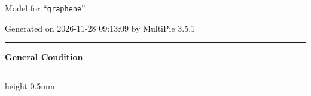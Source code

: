 \documentclass[fleqn,10pt,landscape]{jsarticle}
\begin{document}
\setcounter{MaxMatrixCols}{32}

\renewcommand{\tablename}{Table~}
\renewcommand{\figurename}{Figure~}
\setlength{\baselineskip}{16pt}
\setlength{\parindent}{0pt}
\setlength{\mathindent}{0pt}
\footnotesize
\begin{center}
\LARGE
Model for ``\texttt{graphene}''
\end{center}
\begin{flushright}
Generated on 2026-11-28 09:13:09 by MultiPie 3.5.1
\end{flushright}
\setlength{\baselineskip}{16pt}
\footnotesize
\vspace{5mm}
\noindent \rule[0.5mm]{5mm}{0.5mm}\hspace{3mm}\textbf{General Condition}\hspace{3mm}\leaders\hrule height 0.5mm\hfill\kern0pt
\vspace{3mm}
\end{document}
